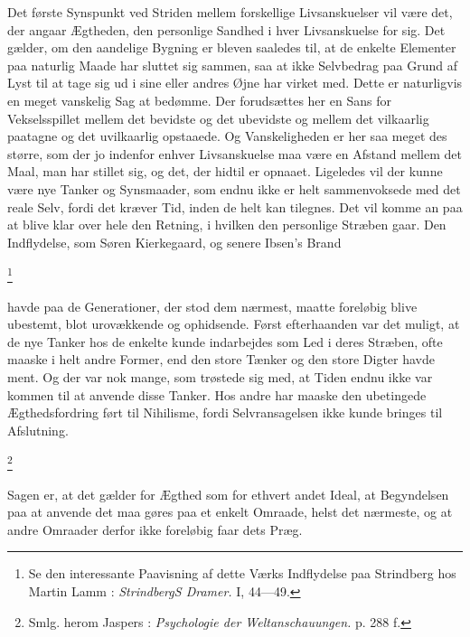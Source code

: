\documentclass[12pt]{article}
\newcommand{\apage}[1]{\marginnote{\footnotesize\textit{[#1]}}}
\begin{document}
Det første Synspunkt ved Striden mellem forskellige Livsanskuelser vil være
det, der angaar Ægtheden, den personlige Sandhed i hver Livsanskuelse for sig.
Det gælder, om den aandelige Bygning er bleven saaledes til, at de enkelte
Elementer paa naturlig Maade har sluttet sig sammen, saa at ikke Selvbedrag paa
Grund af Lyst til at tage sig ud i sine eller andres Øjne har virket med. Dette
er naturligvis en meget vanskelig Sag at bedømme. Der forudsættes her en Sans
for Vekselsspillet mellem det bevidste og det ubevidste og mellem det
vilkaarlig paatagne og det uvilkaarlig opstaaede. Og Vanskeligheden er her saa
meget des større, som der jo indenfor enhver Livsanskuelse maa være en Afstand
mellem det Maal, man har stillet sig, og det, der hidtil er opnaaet. Ligeledes
vil der kunne være nye Tanker og Synsmaader, som endnu ikke er helt
sammenvoksede med det reale Selv, fordi det kræver Tid, inden de helt kan
tilegnes. Det vil komme an paa at blive klar over hele den Retning, i hvilken
den personlige Stræben
\setcounter{footnote}{0}%
\apage{70}gaar. Den Indflydelse, som Søren Kierkegaard, og senere Ibsen's
\guillemotright{}Brand\guillemotleft{}

         \footnote{Se den interessante Paavisning af dette Værks Indflydelse
paa Strindberg hos Martin Lamm :\textit{ StrindbergS Dramer.} I, 44---49.}

       havde paa de Generationer, der stod dem nærmest, maatte foreløbig blive
ubestemt, blot urovækkende og ophidsende. Først efterhaanden var det muligt, at
de nye Tanker hos de enkelte kunde indarbejdes som Led i deres Stræben, ofte
maaske i helt andre Former, end den store Tænker og den store Digter havde
ment. Og der var nok mange, som trøstede sig med, at Tiden endnu ikke var
kommen til at anvende disse Tanker. Hos andre har maaske den ubetingede
Ægthedsfordring ført til Nihilisme, fordi Selvransagelsen ikke kunde bringes
til Afslutning.

         \footnote{Smlg. herom Jaspers :\textit{ \guillemotright{}Psychologie
der Weltanschauungen\guillemotleft{}. }p. 288 f.}

       Sagen er, at det gælder for Ægthed som for ethvert andet Ideal, at
Begyndelsen paa at anvende det maa gøres paa et enkelt Omraade, helst det
nærmeste, og at andre Omraader derfor ikke foreløbig faar dets Præg.
\end{document}
